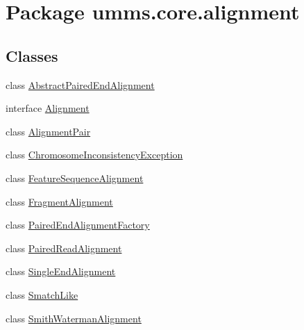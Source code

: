 \hypertarget{namespaceumms_1_1core_1_1alignment}{\section{Package umms.\+core.\+alignment}
\label{namespaceumms_1_1core_1_1alignment}
}
\subsection*{Classes}
\begin{DoxyCompactItemize}
\item 
class \hyperlink{classumms_1_1core_1_1alignment_1_1_abstract_paired_end_alignment}{Abstract\+Paired\+End\+Alignment}
\item 
interface \hyperlink{interfaceumms_1_1core_1_1alignment_1_1_alignment}{Alignment}
\item 
class \hyperlink{classumms_1_1core_1_1alignment_1_1_alignment_pair}{Alignment\+Pair}
\item 
class \hyperlink{classumms_1_1core_1_1alignment_1_1_chromosome_inconsistency_exception}{Chromosome\+Inconsistency\+Exception}
\item 
class \hyperlink{classumms_1_1core_1_1alignment_1_1_feature_sequence_alignment}{Feature\+Sequence\+Alignment}
\item 
class \hyperlink{classumms_1_1core_1_1alignment_1_1_fragment_alignment}{Fragment\+Alignment}
\item 
class \hyperlink{classumms_1_1core_1_1alignment_1_1_paired_end_alignment_factory}{Paired\+End\+Alignment\+Factory}
\item 
class \hyperlink{classumms_1_1core_1_1alignment_1_1_paired_read_alignment}{Paired\+Read\+Alignment}
\item 
class \hyperlink{classumms_1_1core_1_1alignment_1_1_single_end_alignment}{Single\+End\+Alignment}
\item 
class \hyperlink{classumms_1_1core_1_1alignment_1_1_smatch_like}{Smatch\+Like}
\item 
class \hyperlink{classumms_1_1core_1_1alignment_1_1_smith_waterman_alignment}{Smith\+Waterman\+Alignment}
\end{DoxyCompactItemize}
